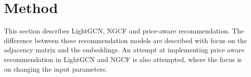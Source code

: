 \section{Method}
This section describes LightGCN, NGCF and price-aware recommendation.
The difference between these recommendation models are described with focus on the adjacency matrix and the embeddings.
An attempt at implementing price aware recommendation in LightGCN and NGCF is also attempted, where the focus is on changing the input parameters.








